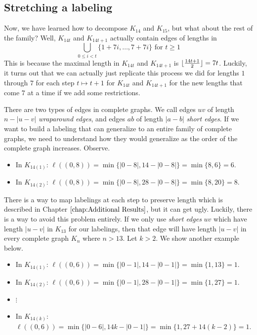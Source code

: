 \subsection{Stretching a labeling}\label{sec:0,1constr-pt2}

  Now, we have learned how to decompose $K_{14}$ and $K_{15}$, but what about the rest of the family? Well, $K_{14t}$ and $K_{14t+1}$ actually contain edges of lengths in 
  $$\bigcup_{0\leq i< t} \{1+7i,\hdots,7+7i\}\text{ for }t\geq 1$$
  This is because the maximal length in $K_{14t}$ and $K_{14t+1}$ is $\lfloor\frac{14t+1}{2}\rfloor=7t$. Luckily, it turns out that we can actually just replicate this process we did for lengths $1$ through $7$ for each step $t\mapsto t+1$ for $K_{14t}$ and $K_{14t+1}$ for the new lengths that come $7$ at a time if we add some restrictions.

  There are two types of edges in complete graphs. We call edges $uv$ of length $n-|u-v|$ \textit{wraparound edges}, and edges $ab$ of length $|a-b|$ \textit{short edges}. If we want to build a labeling that can generalize to an entire family of complete graphs, we need to understand how they would generalize as the order of the complete graph increases. Observe.
  \begin{itemize}
    \item[] In $K_{14(1)}$: $\ell((0,8))=\min\{|0-8|,14-|0-8|\}=\min\{8,6\}=6$.
    \item[] In $K_{14(2)}$: $\ell((0,8))=\min\{|0-8|,28-|0-8|\}=\min\{8,20\}=8$.
  \end{itemize}
  There is a way to map labelings at each step to preserve length which is described in Chapter $\ref{chap:Additional Results}$, but it can get ugly. Luckily, there is a way to avoid this problem entirely. If we only use \textit{short edges} $uv$ which have length $|u-v|$ in $K_{13}$ for our labelings, then that edge will have length $|u-v|$ in every complete graph $K_{n}$ where $n>13$. Let $k>2$. We show another example below.
  \begin{itemize}
    \item[] In $K_{14(1)}$: $\ell((0,6))=\min\{|0-1|,14-|0-1|\}=\min\{1,13\}=1$.
    \item[] In $K_{14(2)}$: $\ell((0,6))=\min\{|0-1|,28-|0-1|\}=\min\{1,27\}=1$.
    \item[] $\vdots$
    \item[] In $K_{14(k)}$: $\ell((0,6))=\min\{|0-6|,14k-|0-1|\}=\min\{1,27+14(k-2)\}=1$.
  \end{itemize}

